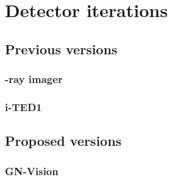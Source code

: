 \chapter{Detector iterations}\label{ch:evolution}

\section{Previous versions}

\subsection{\textgamma-ray imager}

\subsection{i-TED1}

\section{Proposed versions}

\subsection{}

\subsection{GN-Vision}
